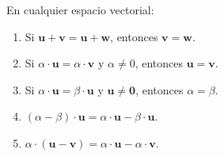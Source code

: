 \newpage

\begin{prop}{}{}
    En cualquier espacio vectorial:
    \begin{enumerate}[label=\roman*), topsep=6pt, itemsep=0pt]
        \item Si $\mathbf{u} + \mathbf{v} = \mathbf{u} + \mathbf{w}$, entonces $\mathbf{v} = \mathbf{w}$.
        \item Si $\alpha \cdot \mathbf{u} = \alpha \cdot \mathbf{v}$ y $\alpha \neq 0$, entonces $\mathbf{u} = \mathbf{v}$.
        \item Si $\alpha \cdot \mathbf{u} = \beta \cdot \mathbf{u}$ y $\mathbf{u} \neq \mathbf{0}$, entonces $\alpha = \beta$.
        \item $(\alpha - \beta) \cdot \mathbf{u} = \alpha \cdot \mathbf{u} - \beta \cdot \mathbf{u}$.
        \item $\alpha \cdot (\mathbf{u} - \mathbf{v}) = \alpha \cdot \mathbf{u} - \alpha \cdot \mathbf{v}$.
    \end{enumerate}
\end{prop}